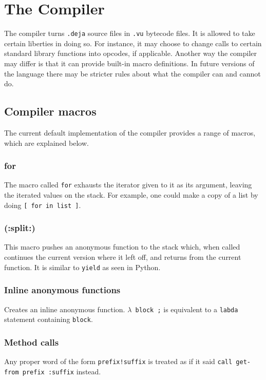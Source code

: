\chapter{The Compiler}

The compiler turns \verb!.deja! source files in \verb!.vu! bytecode files. It
is allowed to take certain liberties in doing so. For instance, it may choose
to change calls to certain standard library functions into opcodes, if
applicable. Another way the compiler may differ is that it can provide built-in
macro definitions. In future versions of the language there may be stricter
rules about what the compiler can and cannot do. 

\section{Compiler macros}

The current default implementation of the compiler provides a range of
macros, which are explained below.

\subsection{for}
The macro called \verb!for! exhausts the iterator given to it as its
argument, leaving the iterated values on the stack. For example, one
could make a copy of a list by doing \verb![ for in list ]!.
\subsection{(:split:)}
This macro pushes an anonymous function to the stack which, when called
continues the current version where it left off, and returns from the
current function. It is similar to \verb!yield! as seen in Python.
\subsection{Inline anonymous functions}
Creates an inline anonymous function. $\lambda$\verb! block ;! is
equivalent to a \verb!labda! statement containing \verb!block!.
\subsection{Method calls}
Any proper word of the form \verb#prefix!suffix# is treated as if it
said \verb#call get-from prefix :suffix# instead.
